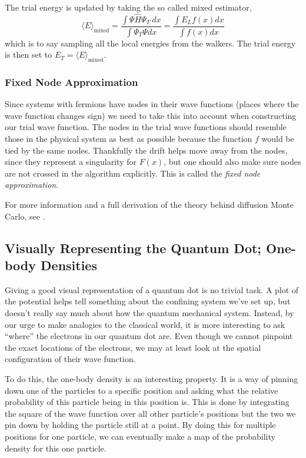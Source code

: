 \documentclass[aps,prb,twocolumn,floatfix]{revtex4}
\begin{document}
The trial energy is updated by taking the so called mixed estimator,
\begin{equation}
    \langle E\rangle_{\text{mixed}} = \frac{\int \Psi \hat H \Psi_T ~dx}{\int \Psi_T \Psi dx} = \frac{\int E_L f(x) dx}{\int f(x) dx}
\end{equation} 
which is to say sampling all the local energies from the walkers.\cite{lecturenotes} The trial energy is then set to $E_T = \langle E \rangle_{\text{mixed}}$.

\subsubsection{Fixed Node Approximation}

Since systems with fermions have nodes in their wave functions (places where the wave function changes sign) we need to take this into account when constructing our trial wave function. The nodes in the trial wave functions should resemble those in the physical system as best as possible because the function $f$ would be tied by the same nodes. Thankfully the drift helps move away from the nodes, since they represent a singularity for $F(x)$, but one should also make sure nodes are not crossed in the algorithm explicitly. This is called the \emph{fixed node approximation}.

For more information and a full derivation of the theory behind diffusion Monte Carlo, see \textcite{lecturenotes}.

\subsection{Visually Representing the Quantum Dot; One-body Densities} \label{sec:density}

Giving a good visual representation of a quantum dot is no trivial task. A plot of the potential helps tell something about the confining system we've set up, but doesn't really say much about how the quantum mechanical system. Instead, by our urge to make analogies to the classical world, it is more interesting to ask ``where'' the electrons in our quantum dot are. Even though we cannot pinpoint the exact locations of the electrons, we may at least look at the spatial configuration of their wave function.

To do this, the one-body density is an interesting property. It is a way of pinning down one of the particles to a specific position and asking what the relative probability of this particle being in this position is. This is done by integrating the square of the wave function over all other particle's positions but the two we pin down by holding the particle still at a point. By doing this for multiple positions for one particle, we can eventually make a map of the probability density for this one particle.
\end{document}
